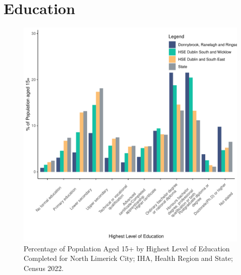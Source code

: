 \documentclass{article}
\begin{document}
\section{Education}\label{sect:Edu}
\begin{figure}[H]
	\centering
	\includegraphics[width = 120mm]{../figures/EduED.pdf}
	\caption{Percentage of Population Aged 15+ by Highest Level of Education Completed for North Limerick City; IHA, Health Region and State; Census 2022.}
	\label{fig:vbnv}
	\end{figure}
\end{document}
